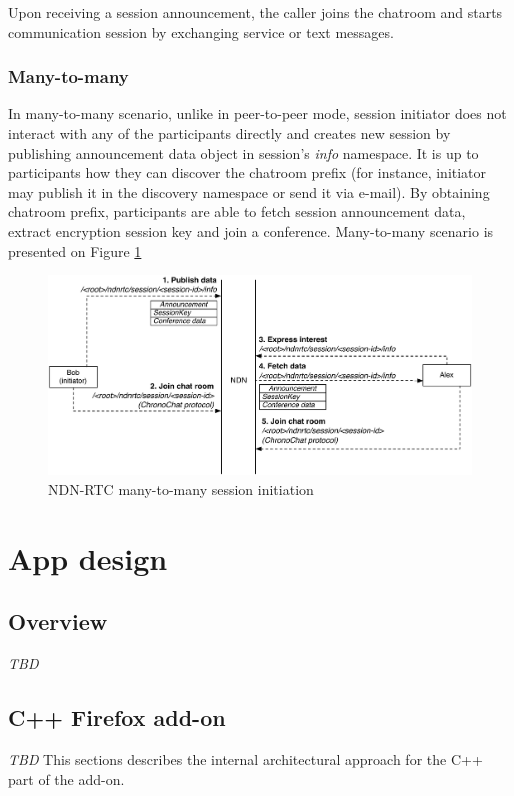 \documentclass[12pt]{article}
\begin{document}
Upon receiving a session announcement, the caller joins the chatroom and starts communication session by exchanging service or text messages. 

\subsubsection{Many-to-many}

In many-to-many scenario, unlike in peer-to-peer mode, session initiator does not interact with any of the participants directly and creates new session by publishing announcement data object in session's \textit{info} namespace. It is up to participants how they can discover the chatroom prefix (for instance, initiator may publish it in the discovery namespace or send it via e-mail). By obtaining chatroom prefix, participants are able to fetch session announcement data, extract encryption session key and join a conference. Many-to-many scenario is presented on Figure \ref{fig:m2m}

\begin{figure}[Ht!]
\centering
\includegraphics[width=\textwidth]{../res/graphics/m2m}
\caption{NDN-RTC many-to-many session initiation}
\label{fig:m2m}
\end{figure}

\section{App design}
\subsection{Overview}
\textit{TBD}
\subsection{C++ Firefox add-on}
\textit{TBD}
This sections describes the internal architectural approach for the C++ part of the add-on.
\end{document}
